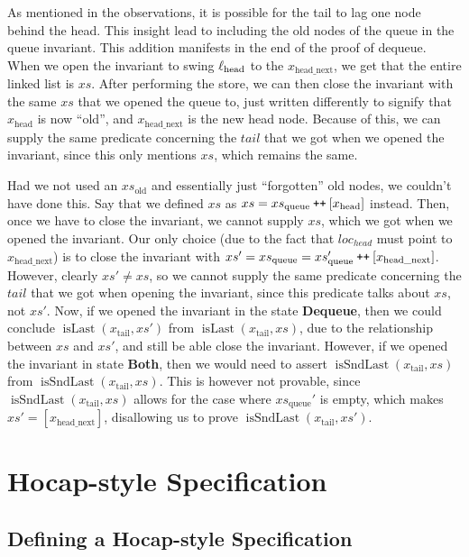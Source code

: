 \documentclass[a4paper, 10pt]{report}
\theoremstyle{definition}
\newcommand{\xsc}{xs}
\newcommand{\xsqueue}{xs_{\mathrm{queue}}}
\newcommand{\xsold}{xs_{\mathrm{old}}}
\newcommand{\isLast}{\operatorname{isLast}}
\newcommand{\isSndLast}{\operatorname{isSndLast}}
\newcommand{\locN}[1]{\loc_{\mathrm{#1}}}
\newcommand{\lochead}{\locN{head}}
\newcommand{\node}{x}
\newcommand{\nodeN}[1]{\node_{\mathrm{#1}}}
\newcommand{\nodehead}{\nodeN{head}}
\newcommand{\nodetail}{\nodeN{tail}}
\newcommand{\nodeheadnext}{\nodeN{head\_next}}
\newcommand{\DequeueState}{\textbf{Dequeue}}
\newcommand{\BothState}{\textbf{Both}}
\newcommand\catenate{\mathbin{\text{\ttfamily\upshape ++}}}
\begin{document}
As mentioned in the observations, it is possible for the tail to lag one node behind the head. This insight lead to including the old nodes of the queue in the queue invariant. This addition manifests in the end of the proof of dequeue. When we open the invariant to swing $\lochead$ to the $\nodeheadnext$, we get that the entire linked list is $\xsc$. After performing the store, we can then close the invariant with the same $\xsc$ that we opened the queue to, just written differently to signify that $\nodehead$ is now ``old'', and $\nodeheadnext$ is the new head node. Because of this, we can supply the same predicate concerning the $tail$ that we got when we opened the invariant, since this only mentions $\xsc$, which remains the same.

Had we not used an $\xsold$ and essentially just ``forgotten'' old nodes, we couldn't have done this. Say that we defined $\xsc$ as $\xsc = \xsqueue \catenate [\nodehead]$ instead. Then, once we have to close the invariant, we cannot supply $\xsc$, which we got when we opened the invariant. Our only choice (due to the fact that $loc_{head}$ must point to $\nodeheadnext$) is to close the invariant with $\xsc' = \xsqueue = \xsqueue' \catenate [\nodeheadnext]$. However, clearly $\xsc' \neq \xsc$, so we cannot supply the same predicate concerning the $tail$ that we got when opening the invariant, since this predicate talks about $\xsc$, not $\xsc'$. Now, if we opened the invariant in the state \DequeueState{}, then we could conclude $\isLast(\nodetail, \xsc')$ from $\isLast(\nodetail, \xsc)$, due to the relationship between $\xsc$ and $\xsc'$, and still be able close the invariant. However, if we opened the invariant in state \BothState{}, then we would need to assert $\isSndLast(\nodetail, \xsc)$ from $\isSndLast(\nodetail, \xsc)$. This is however not provable, since $\isSndLast(\nodetail, \xsc)$ allows for the case where $\xsqueue'$ is empty, which makes $\xsc' = [\nodeheadnext]$, disallowing us to prove $\isSndLast(\nodetail, \xsc')$.


\chapter{Hocap-style Specification}
\label{ch:TLMSQHOCAP}

\section{Defining a Hocap-style Specification}
\label{TLMSQHOCAP:section:hocap-spec}
\end{document}
